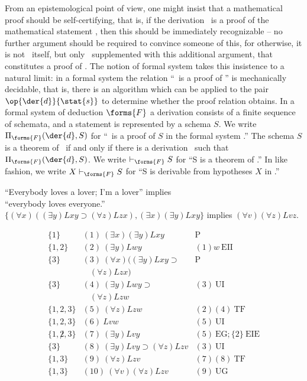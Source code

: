 From an epistemological point of view, one might insist that a mathematical proof should be self-certifying, that is, if the derivation \ is a proof of the mathematical statement , then this should be immediately recognizable -- no further argument should be required to convince someone of this, for otherwise, it is not \ itself, but only \ supplemented with this additional argument, that constitutes a proof of . The notion of formal system takes this insistence to a natural limit: in a formal system the relation ``\ is a proof of '' is mechanically decidable, that is, there is an algorithm which can be applied to the pair $\op{\der{d}}{\stat{s}}$ to determine whether the proof relation obtains. In a formal system of deduction $\forms{F}$ a derivation  consists of a finite sequence of schemata, and a statement  is represented by a schema $S$. We write $\Pi_{\forms{F}}(\der{d},S)$ for ``\ is a proof of $S$ in the formal system .'' The schema $S$ is a theorem of \ if and only if there is a derivation \ such that $\Pi_{\forms{F}}(\der{d},S)$. We write $\vdash_{\forms{F}}S$ for ``S is a theorem of .'' In like fashion, we write $X\vdash_{\forms{F}}S$ for ``S is derivable from hypotheses $X$ in .''

\begin{center}
``Everybody loves a lover; I'm a lover'' implies \\
``everybody loves everyone.'' \\
$\{(\forall x) ((\exists y) Lxy \supset (\forall z) Lzx), (\exists x)(\exists
y) Lxy \}$ implies $(\forall v)(\forall z) Lvz.$
\end{center}
\[
\begin{array}{lll}
\{1\}   & (1)\  (\exists x)(\exists y) Lxy &  \mathrm{P}\\
\{1,2\}   & (2)\ (\exists y) Lwy  & (1)w\ \mathrm{EII}\\
\{3\}   & (3)\ (\forall x) ((\exists y) Lxy \supset   & 
\mathrm{P}\\
  &\ \ \ \  (\forall z) Lzx)  & \\
\{3\}   & (4)\ (\exists y) Lwy \supset   & (3)\ \mathrm{UI}\\
  &\ \ \ \ (\forall z) Lzw & \\
\{1,2,3\}   & (5)\ (\forall z) Lzw  & (2)(4)\ \mathrm{TF}\\
\{1,2,3\}   & (6)\ Lvw  & (5)\ \mathrm{UI}\\
\{1,\not 2,3\}   & (7)\ (\exists y) Lvy  & (5)\ \mathrm{EG};\{2\}\
\mathrm{EIE}\\ 
\{3\}   & (8)\ (\exists y) Lvy \supset (\forall z) Lzv  & (3)\ \mathrm{UI}\\
\{1,3\}   & (9)\  (\forall z) Lzv & (7)(8)\ \mathrm{TF}\\
\{1,3\}   & (10)\  (\forall v)(\forall z) Lzv & (9)\ \mathrm{UG}
\end{array}
\]

